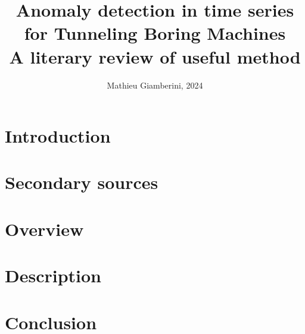 \documentclass{article}
\title{Anomaly detection in time series for Tunneling Boring Machines \\ \small{A literary review of useful method}}
\author{Mathieu Giamberini, 2024}
\date{}
\begin{document}
    \maketitle
    \begin{abstract}
        
    \end{abstract}
    
    \begin{multicols}{2}
        \section*{Introduction}
            

        \section{Secondary sources}
            

        \section{Overview}
            


        \section{Description}
            


        \section*{Conclusion}
            
    
    \end{multicols}
\end{document}
